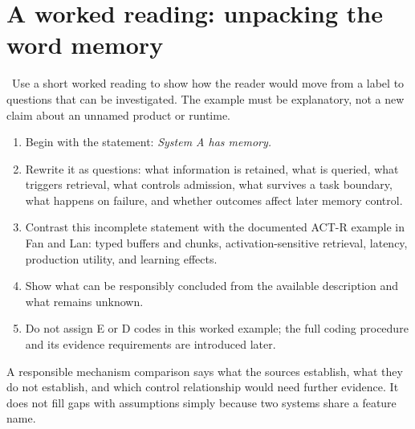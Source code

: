 \section{A worked reading: unpacking the word memory}
\BookExampleLabel\ Use a short worked reading to show how the reader would move from a label to questions that can be investigated. The example must be explanatory, not a new claim about an unnamed product or runtime.
\begin{enumerate}
  \item Begin with the statement: \emph{System A has memory.}
  \item Rewrite it as questions: what information is retained, what is queried, what triggers retrieval, what controls admission, what survives a task boundary, what happens on failure, and whether outcomes affect later memory control.
  \item Contrast this incomplete statement with the documented ACT-R example in Fan and Lan: typed buffers and chunks, activation-sensitive retrieval, latency, production utility, and learning effects.
  \item Show what can be responsibly concluded from the available description and what remains unknown.
  \item Do not assign E or D codes in this worked example; the full coding procedure and its evidence requirements are introduced later.
\end{enumerate}
\begin{takeawaybox}
A responsible mechanism comparison says what the sources establish, what they do not establish, and which control relationship would need further evidence. It does not fill gaps with assumptions simply because two systems share a feature name.
\end{takeawaybox}

